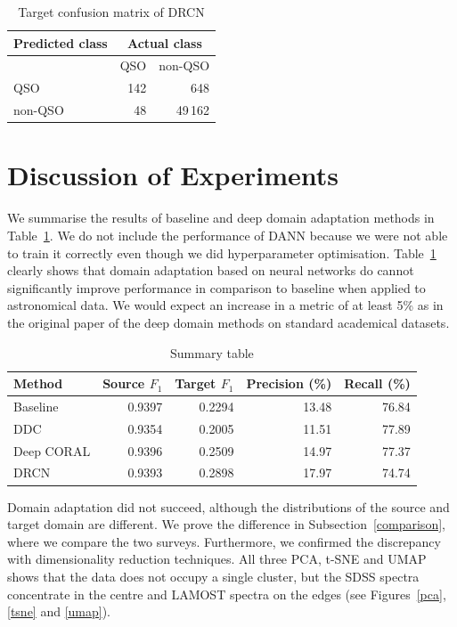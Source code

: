 \begin{table}
\begin{center}
\begin{tabular}{|l|r|r|}
	\hline
	Predicted class & \multicolumn{2}{c|}{Actual class} \\
	\hline \hline
	& QSO & non-QSO \\ \hline
	QSO & 142 & 648 \\ \hline
	non-QSO & 48 & 49\,162 \\ \hline
\end{tabular}
\end{center}
\caption{Target confusion matrix of DRCN}
\end{table}

\section{Discussion of Experiments}

We summarise the results of baseline and deep domain adaptation methods in Table~\ref{summary}.
We do not include the performance of DANN
because we were not able to train it correctly even though we did hyperparameter optimisation.
Table~\ref{summary} clearly shows that domain adaptation based on neural networks do cannot significantly improve performance in comparison to baseline
when applied to astronomical data.
We would expect an increase in a metric of at least 5\% as in the original paper of the deep domain methods on standard academical datasets.

\begin{table}
\begin{center}
\begin{tabular}{|l|r|r|r|r|}
	\hline
	Method & Source \(F_1\) & Target \(F_1\) & Precision (\%) & Recall (\%) \\
	\hline \hline
	Baseline & 0.9397 & 0.2294 & 13.48 & 76.84 \\ \hline
	DDC & 0.9354 & 0.2005 & 11.51 & 77.89 \\ \hline
	Deep CORAL & 0.9396 & 0.2509 & 14.97 & 77.37 \\ \hline
	DRCN & 0.9393 & 0.2898 & 17.97 & 74.74 \\ \hline
\end{tabular}
\end{center}
\caption{Summary table}
\label{summary}
\end{table}

Domain adaptation did not succeed,
although the distributions of the source and target domain are different.
We prove the difference in Subsection~\ref{comparison},
where we compare the two surveys.
Furthermore, we confirmed the discrepancy with dimensionality reduction techniques.
All three PCA, t-SNE and UMAP shows that the data does not occupy a single cluster,
but the SDSS spectra concentrate in the centre and LAMOST spectra on the edges
(see Figures~\ref{pca}, \ref{tsne} and \ref{umap}).


